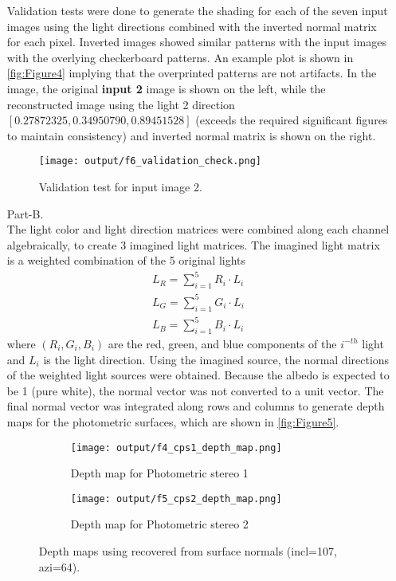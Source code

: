 \documentclass[12pt]{report}
\begin{document}
\begin{enumerate}
    \FloatBarrier 
    
    Validation tests were done to generate the shading for each of the seven input images using the light directions combined with the inverted normal matrix for 
    each pixel. Inverted images showed similar patterns with the input images with the overlying checkerboard patterns. An example plot is shown in \autoref{fig:Figure4} 
    implying that the overprinted patterns are not artifacts. In the image, the original \textbf{input 2} image is shown on the left, while the reconstructed image 
    using the light 2 direction $[0.27872325,0.34950790,0.89451528]$ (exceeds the required significant figures to maintain consistency) and inverted normal matrix is 
    shown on the right.

    \begin{figure}[H]
        \centering
        \texttt{[image: output/f6\_validation\_check.png]}
        \caption{Validation test for input image 2.}
        \label{fig:Figure4}
    \end{figure}

    \FloatBarrier

    \item[Part-B.]
    \ \\
    The light color and light direction matrices were combined along each channel algebraically, to create 3 imagined light matrices. The imagined light matrix 
    is a weighted combination of the 5 original lights 
    \begin{align*}
    L_R = \sum_{i=1}^5 R_i \cdot L_i \\
    L_G = \sum_{i=1}^5 G_i \cdot L_i \\
    L_B = \sum_{i=1}^5 B_i \cdot L_i
    \end{align*}
    where \( (R_i,G_i,B_i) \) are the red, green, and blue components of the \(i^{-th}\) light and \( L_i \) is the light direction. Using the imagined source, 
    the normal directions of the weighted light sources were obtained. Because the albedo is expected to be 1 (pure white), the normal vector was not converted to 
    a unit vector. The final normal vector was integrated along rows and columns to generate depth maps for the photometric surfaces, which are shown in 
    \autoref{fig:Figure5}.

    \begin{figure}[H]\centering
        \hspace*{-0.4in}
        \begin{subfigure}{0.40\textwidth}
            \texttt{[image: output/f4\_cps1\_depth\_map.png]}
            \caption{Depth map for Photometric stereo 1}
            \label{fig:Figure5a}
        \end{subfigure}
    \hfil
        \begin{subfigure}{0.40\textwidth}
        \texttt{[image: output/f5\_cps2\_depth\_map.png]}
        \caption{Depth map for Photometric stereo 2}
        \label{fig:Figure5b}
        \end{subfigure}
        \caption{Depth maps using recovered from surface normals (incl=107, azi=64).}
        \label{fig:Figure5}
    \end{figure}


\end{enumerate}
\end{document}
